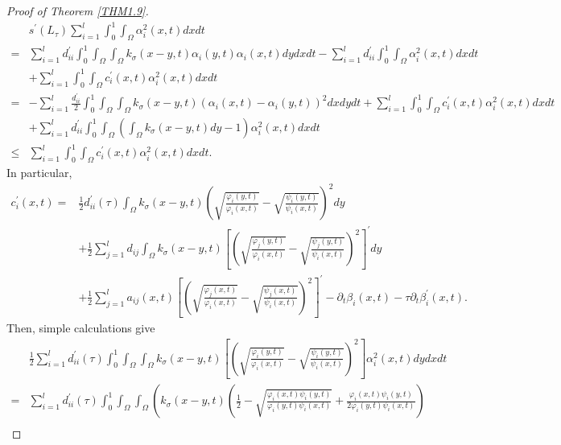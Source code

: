 \documentclass[11pt,reqno]{amsart}
\numberwithin{equation}{section}
\begin{document}
\begin{proof}[Proof of Theorem \ref{THM1.9}]
\begin{align}\label{3-17}
& s^{\prime}(L_{\tau}) \sum_{i=1}^{l} \int_{0}^{1} \int_{\Omega} \alpha^{2}_{i}(x,t)dxdt
\\ \nonumber
=&
\sum_{i=1}^{l} d_{ii}^{\prime} \int_{0}^{1}\int_{\Omega}\int_{\Omega}k_{\sigma}(x-y,t)\alpha_{i}(y,t)\alpha_{i}(x,t)dydxdt - \sum_{i=1}^{l} d_{ii}^{\prime} \int_{0}^{1}\int_{\Omega} \alpha_{i}^{2}(x,t)dxdt
\\  \nonumber
&+ \sum_{i=1}^{l} \int_{0}^{1}\int_{\Omega}c_{i}^{\prime}(x,t)\alpha_{i}^{2}(x,t)dxdt
\\ \nonumber
=&
- \sum_{i=1}^{l}\frac{d_{ii}^{\prime}}{2} \int_{0}^{1} \int_{\Omega}\int_{\Omega} k_{\sigma}(x-y,t)(\alpha_{i}(x,t)-\alpha_{i}(y,t))^{2}dxdydt
+ \sum_{i=1}^{l} \int_{0}^{1}\int_{\Omega}c_{i}^{\prime}(x,t)\alpha_{i}^{2}(x,t)dxdt
\\ \nonumber
& +  \sum_{i=1}^{l}d_{ii}^{\prime}\int_{0}^{1} \int_{\Omega} \left( \int_{\Omega}  k_{\sigma}(x-y,t) dy - 1 \right)\alpha_{i}^{2}(x,t)dxdt
\\ \nonumber
\leq & \sum_{i=1}^{l} \int_{0}^{1}\int_{\Omega}c_{i}^{\prime}(x,t)\alpha_{i}^{2}(x,t)dxdt.
\end{align}
%
In particular,
%
\begin{align*}
c_{i}^{\prime}(x,t)=& \frac{1}{2} d_{ii}^{\prime}(\tau) \int_{\Omega}k_{\sigma}(x-y,t)\left( \sqrt{ \frac{\varphi_{i}(y,t)}{\varphi_{i}(x,t)}} - \sqrt{\frac{\psi_{i}(y,t)}{\psi_{i}(x,t)}} \right)^{2}dy \\
&+ \frac{1}{2}\sum_{j=1}^{l}d_{ij} \int_{\Omega}k_{\sigma}(x-y,t) \left[ \left( \sqrt{ \frac{\varphi_{j}(y,t)}{\varphi_{i}(x,t)}} - \sqrt{\frac{\psi_{j}(y,t)}{\psi_{i}(x,t)}} \right)^{2} \right]^{\prime}dy\\
&+ \frac{1}{2}\sum_{j=1}^{l}a_{ij}(x,t)\left[ \left( \sqrt{ \frac{\varphi_{j}(x,t)}{\varphi_{i}(x,t)}} - \sqrt{\frac{\psi_{j}(x,t)}{\psi_{i}(x,t)}} \right)^{2} \right]^{\prime} - \partial_{t}\beta_{i}(x,t) - \tau \partial_{t}\beta_{i}^{\prime}(x,t).
\end{align*}
%
Then, simple calculations give
%
\begin{equation}\label{3-18}
\begin{aligned}
&\frac{1}{2}\sum_{i=1}^{l} d_{ii}^{\prime}(\tau) \int_{0}^{1}\int_{\Omega}  \int_{\Omega}  k_{\sigma}(x-y,t) \left[ \left( \sqrt{ \frac{\varphi_{i}(y,t)}{\varphi_{i}(x,t)}} - \sqrt{\frac{\psi_{i}(y,t)}{\psi_{i}(x,t)}} \right)^{2} \right]\alpha_{i}^{2}(x,t)dydxdt
\\
=&\sum_{i=1}^{l} d_{ii}^{\prime}(\tau)\int_{0}^{1}\int_{\Omega}  \int_{\Omega} \left( k_{\sigma}(x-y,t) \left( \frac{1}{2} - \sqrt{ \frac{\varphi_{i}(x,t)\psi_{i}(y,t)}{\varphi_{i}(y,t)\psi_{i}(x,t) } } +\frac{\varphi_{i}(x,t)\psi_{i}(y,t)}{2\varphi_{i}(y,t)\psi_{i}(x,t)} \right) \right.\\

\end{aligned}
\end{equation}
\end{proof}
\end{document}
